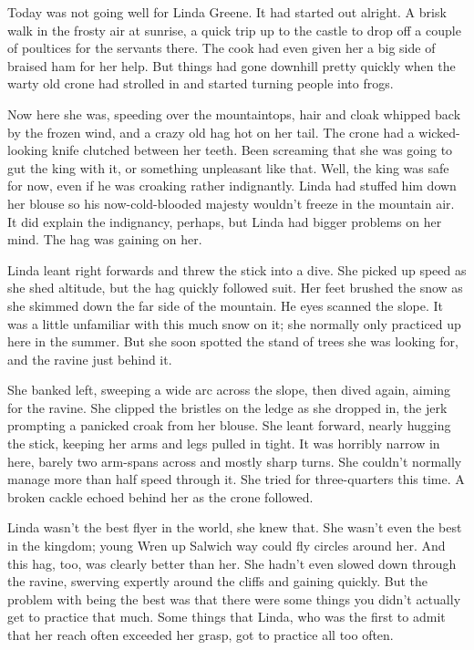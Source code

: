 Today was not going well for Linda Greene.
It had started out alright.
A brisk walk in the frosty air at sunrise, a quick trip up to the castle to drop off a couple of poultices for the servants there.
The cook had even given her a big side of braised ham for her help.
But things had gone downhill pretty quickly when the warty old crone had strolled in and started turning people into frogs.

Now here she was, speeding over the mountaintops, hair and cloak whipped back by the frozen wind, and a crazy old hag hot on her tail.
The crone had a wicked-looking knife clutched between her teeth.
Been screaming that she was going to gut the king with it, or something unpleasant like that.
Well, the king was safe for now, even if he was croaking rather indignantly.
Linda had stuffed him down her blouse so his now-cold-blooded majesty wouldn't freeze in the mountain air.
It did explain the indignancy, perhaps, but Linda had bigger problems on her mind.
The hag was gaining on her.

Linda leant right forwards and threw the stick into a dive.
She picked up speed as she shed altitude, but the hag quickly followed suit.
Her feet brushed the snow as she skimmed down the far side of the mountain.
He eyes scanned the slope.
It was a little unfamiliar with this much snow on it; she normally only practiced up here in the summer.
But she soon spotted the stand of trees she was looking for, and the ravine just behind it.

She banked left, sweeping a wide arc across the slope, then dived again, aiming for the ravine.
She clipped the bristles on the ledge as she dropped in, the jerk prompting a panicked croak from her blouse.
She leant forward, nearly hugging the stick, keeping her arms and legs pulled in tight.
It was horribly narrow in here, barely two arm-spans across and mostly sharp turns.
She couldn't normally manage more than half speed through it.
She tried for three-quarters this time.
A broken cackle echoed behind her as the crone followed.

Linda wasn't the best flyer in the world, she knew that.
She wasn't even the best in the kingdom; young Wren up Salwich way could fly circles around her.
And this hag, too, was clearly better than her.
She hadn't even slowed down through the ravine, swerving expertly around the cliffs and gaining quickly.
But the problem with being the best was that there were some things you didn't actually get to practice that much.
Some things that Linda, who was the first to admit that her reach often exceeded her grasp, got to practice all too often.


